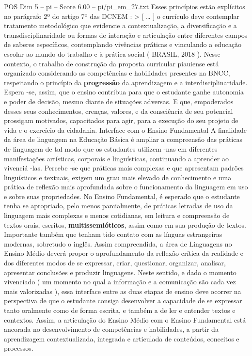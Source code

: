\begin{textsample}{POS Dim 5 – pi – Score 6.00 – pi/pi\_em\_27.txt}
Esses princípios estão explícitos no parágrafo 2º do artigo 7º das DCNEM : > [ … ] o currículo deve contemplar tratamento metodológico que evidencie a contextualização, a diversificação e a transdisciplinaridade ou formas de interação e articulação entre diferentes campos de saberes específicos, contemplando vivências práticas e vinculando a educação escolar ao mundo do trabalho e à prática social ( BRASIL, 2018 ).
Nesse contexto, o trabalho de construção da proposta curricular piauiense está organizado considerando as competências e habilidades presentes na BNCC, respeitando o princípio da \textbf{progressão} da aprendizagem e a interdisciplinaridade.
Espera -se, assim, que o ensino contribua para que o estudante ganhe autonomia e poder de decisão, mesmo diante de situações adversas.
E que, empoderados desses seus conhecimentos, crenças, valores, e da consciência de seu potencial prossigam motivados, capacitados para agir, para a execução do seu projeto de vida e o exercício da cidadania.
Interface com o Ensino Fundamental A finalidade da área de linguagem na Educação Básica é ampliar a compreensão das práticas de linguagem de tal modo que os estudantes utilizem -nas em diferentes manifestações artísticas, corporais e linguísticas, continuando a aprender ao vivenciá -las.
Percebe -se que práticas mais complexas e que apresentam padrões linguísticos e textuais, exigem um grau mais elevado de conhecimento e uma prática de reflexão mais aprofundada sobre o funcionamento da linguagem em uso e sobre suas propriedades.
No Ensino Fundamental, é esperado que o estudante tenha se apropriado, pelo menos parcialmente, de práticas letradas de uso da linguagem mais complexas e menos cotidianas, em leitura e compreensão de textos orais, escritos, \textbf{multissemióticos}, assim como em sua produção de textos.
Importante também que tenham tido contato com as línguas estrangeiras modernas, sobretudo o inglês.
Assim compreendida, a área de Linguagens no Ensino Médio deverá propor o aprofundamento da reflexão crítica da realidade e dos diferentes modos de se expressar, criar, questionar, organizar, analisar, apresentar conclusões e produzir linguagens.
Neste sentido, e dado o momento vivenciado ( um momento no qual a informação e a comunicação são cada vez mais valorizadas ), essa interface entre as duas etapas de ensino deve ocorrer na perspectiva de que o estudante consiga desenvolver a capacidade de se expressar tanto oralmente como de forma escrita, e também a de ler e entender textos e contextos.
Assim, a articulação do Ensino Médio com o Ensino Fundamental está ancorada no desenvolvimento de competências e habilidades, a partir da aprendizagem contextualizada, integrada e articulada de conteúdos, conceitos e processos.

\end{textsample}
